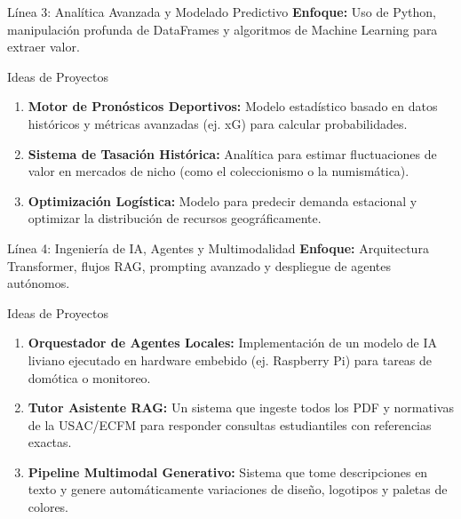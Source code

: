 \documentclass[aspectratio=169]{beamer}
\begin{document}
\begin{frame}{Línea 3: Analítica Avanzada y Modelado Predictivo}
    \textbf{Enfoque:} Uso de Python, manipulación profunda de DataFrames y algoritmos de Machine Learning para extraer valor.
    
    \vspace{0.3cm}
    \begin{exampleblock}{Ideas de Proyectos}
        \begin{enumerate}
            \item \textbf{Motor de Pronósticos Deportivos:} Modelo estadístico basado en datos históricos y métricas avanzadas (ej. xG) para calcular probabilidades.
            \item \textbf{Sistema de Tasación Histórica:} Analítica para estimar fluctuaciones de valor en mercados de nicho (como el coleccionismo o la numismática).
            \item \textbf{Optimización Logística:} Modelo para predecir demanda estacional y optimizar la distribución de recursos geográficamente.
        \end{enumerate}
    \end{exampleblock}
\end{frame}

\begin{frame}{Línea 4: Ingeniería de IA, Agentes y Multimodalidad}
    \textbf{Enfoque:} Arquitectura Transformer, flujos RAG, prompting avanzado y despliegue de agentes autónomos.
    
    \vspace{0.3cm}
    \begin{exampleblock}{Ideas de Proyectos}
        \begin{enumerate}
            \item \textbf{Orquestador de Agentes Locales:} Implementación de un modelo de IA liviano ejecutado en hardware embebido (ej. Raspberry Pi) para tareas de domótica o monitoreo.
            \item \textbf{Tutor Asistente RAG:} Un sistema que ingeste todos los PDF y normativas de la USAC/ECFM para responder consultas estudiantiles con referencias exactas.
            \item \textbf{Pipeline Multimodal Generativo:} Sistema que tome descripciones en texto y genere automáticamente variaciones de diseño, logotipos y paletas de colores.
        \end{enumerate}
    \end{exampleblock}
\end{frame}
\end{document}

